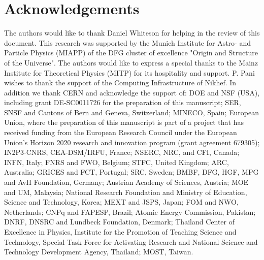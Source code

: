 \section*{Acknowledgements}

The authors would like to thank Daniel Whiteson for helping in the review of this document. 
This research was supported by the Munich Institute for Astro- and Particle Physics (MIAPP) of the DFG cluster of excellence "Origin and Structure of the Universe". The authors would like to express a special thanks to the Mainz Institute for Theoretical Physics (MITP) for its hospitality and support. P. Pani wishes to thank the support of the Computing Infrastructure of Nikhef.
In addition we thank CERN and acknowledge the support of:
DOE and NSF (USA), including grant DE-SC0011726 for the preparation of this manuscript;
SER, SNSF and Cantons of Bern and Geneva, Switzerland; 
MINECO, Spain;
European Union, where the preparation of this manuscript is part of a project that has received funding from the European Research Council under the European Union’s Horizon 2020 research and innovation program (grant agreement 679305);
IN2P3-CNRS, CEA-DSM/IRFU, France;
NSERC, NRC, and CFI, Canada;
INFN, Italy;
FNRS and FWO, Belgium; 
STFC, United Kingdom;
ARC, Australia; 
GRICES and FCT, Portugal;
SRC, Sweden;
BMBF, DFG, HGF, MPG and AvH Foundation, Germany; 
Austrian Academy of Sciences, Austria; 
MOE and UM, Malaysia;
National Research Foundation and Ministry of Education, Science and Technology, Korea;
MEXT and JSPS, Japan; 
FOM and NWO, Netherlands;
CNPq and FAPESP, Brazil;
Atomic Energy Commission, Pakistan;
DNRF, DNSRC and Lundbeck Foundation, Denmark;
Thailand Center of Excellence in Physics, Institute for the Promotion of Teaching Science and Technology, Special Task Force for Activating Research and National Science and Technology Development Agency, Thailand; 
MOST, Taiwan.

\clearpage
